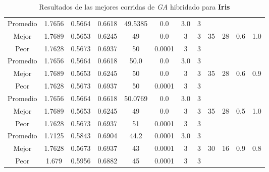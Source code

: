 \begin{table}[h!]
\begin{center}
\begin{tabular}{|c|c|c|c|c|c|c|c|c|c|c|c|}
        \hline
        \hline
            Promedio  & 1.7656 & 0.5664 & 0.6618 & 49.5385 & 0.0 & 3.0 & 3 &  &  &  & \\
            \cline{1-8}
            Mejor & 1.7689 & 0.5653  & 0.6245 & 49 & 0.0 & 3 & 3 & 35 & 28 & 0.6 & 1.0\\
            \cline{1-8}
            Peor & 1.7628 & 0.5673  & 0.6937 & 50 & 0.0001 & 3 & 3 &  &  &  & \\
        \hline
        \hline
            Promedio  & 1.7656 & 0.5664 & 0.6618 & 50.0 & 0.0 & 3.0 & 3 &  &  &  & \\
            \cline{1-8}
            Mejor & 1.7689 & 0.5653  & 0.6245 & 50 & 0.0 & 3 & 3 & 35 & 28 & 0.6 & 0.9\\
            \cline{1-8}
            Peor & 1.7628 & 0.5673  & 0.6937 & 50 & 0.0001 & 3 & 3 &  &  &  & \\
        \hline
        \hline
            Promedio  & 1.7656 & 0.5664 & 0.6618 & 50.0769 & 0.0 & 3.0 & 3 &  &  &  & \\
            \cline{1-8}
            Mejor & 1.7689 & 0.5653  & 0.6245 & 49 & 0.0 & 3 & 3 & 35 & 28 & 0.5 & 1.0\\
            \cline{1-8}
            Peor & 1.7628 & 0.5673  & 0.6937 & 51 & 0.0001 & 3 & 3 &  &  &  & \\
        \hline
        \hline
            Promedio  & 1.7125 & 0.5843 & 0.6904 & 44.2 & 0.0001 & 3.0 & 3 &  &  &  & \\
            \cline{1-8}
            Mejor & 1.7628 & 0.5673  & 0.6937 & 43 & 0.0001 & 3 & 3 & 30 & 16 & 0.9 & 0.8\\
            \cline{1-8}
            Peor & 1.679 & 0.5956  & 0.6882 & 45 & 0.0001 & 3 & 3 &  &  &  & \\
        \hline
        \end{tabular}
        \caption{Resultados de las mejores corridas de \emph{GA} hibridado para {\bf Iris}}
        \label{tb:tablegahibcsv}
    \end{center}
\end{table}


